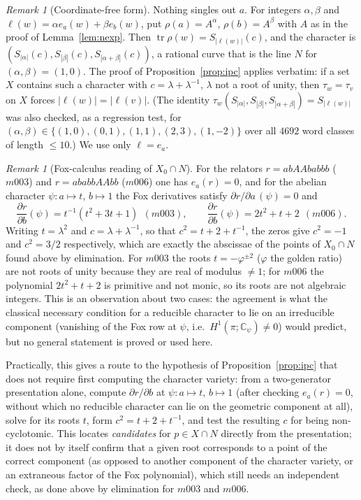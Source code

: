 \documentclass[11pt,a4paper]{article}
\theoremstyle{definition}
\theoremstyle{remark}
\newtheorem{remark}[theorem]{Remark}
\newcommand{\tr}{\operatorname{tr}}
\begin{document}
\begin{remark}[Coordinate-free form]
Nothing singles out $a$. For integers $\alpha,\beta$ and
$\ell(w)=\alpha e_a(w)+\beta e_b(w)$, put $\rho(a)=A^{\alpha}$,
$\rho(b)=A^{\beta}$ with $A$ as in the proof of
Lemma~\ref{lem:nexp}. Then $\tr\rho(w)=S_{|\ell(w)|}(c)$, and the
character is $(S_{|\alpha|}(c),S_{|\beta|}(c),S_{|\alpha+\beta|}(c))$,
a rational curve that is the line $N$ for $(\alpha,\beta)=(1,0)$.
The proof of Proposition~\ref{prop:ipc} applies verbatim: if a set $X$
contains such a character with $c=\lambda+\lambda^{-1}$, $\lambda$ not a
root of unity, then $\tau_w=\tau_v$ on $X$ forces $|\ell(w)|=|\ell(v)|$.
(The identity $\tau_w(S_{|\alpha|},S_{|\beta|},S_{|\alpha+\beta|})=S_{|\ell(w)|}$
was also checked, as a regression test, for $(\alpha,\beta)\in\{(1,0),(0,1),
(1,1),(2,3),(1,-2)\}$ over all $4692$ word classes of length $\le10$.)
We use only $\ell=e_a$.
\end{remark}

\begin{remark}[Fox-calculus reading of $X_0\cap N$]
For the relators $r=abAAbabbb$ ($m003$) and $r=ababbAAbb$ ($m006$) one
has $e_a(r)=0$, and for the abelian character $\psi:a\mapsto t$, $b\mapsto1$
the Fox derivatives satisfy $\partial r/\partial a\,(\psi)=0$ and
\begin{equation}
\frac{\partial r}{\partial b}(\psi)=t^{-1}(t^2+3t+1)\ \ (m003),\qquad
\frac{\partial r}{\partial b}(\psi)=2t^2+t+2\ \ (m006).
\end{equation}
Writing $t=\lambda^2$ and $c=\lambda+\lambda^{-1}$, so that
$c^2=t+2+t^{-1}$, the zeros give $c^2=-1$ and $c^2=3/2$ respectively, which
are exactly the abscissae of the points of $X_0\cap N$ found above by
elimination. For $m003$ the roots $t=-\varphi^{\pm2}$ ($\varphi$ the golden
ratio) are not roots of unity because they are real of modulus
$\ne1$; for $m006$ the polynomial $2t^2+t+2$ is primitive and not monic, so its
roots are not algebraic integers. This is an observation about two cases: the
agreement is what the classical necessary condition for a reducible
character to lie on an irreducible component (vanishing of the Fox row at
$\psi$, i.e.\ $H^1(\pi;\mathbb{C}_\psi)\ne0$) would predict, but no
general statement is proved or used here.

Practically, this gives a route to the hypothesis of
Proposition~\ref{prop:ipc} that does not require first computing the
character variety: from a two-generator presentation alone, compute
$\partial r/\partial b$ at $\psi:a\mapsto t,\,b\mapsto1$ (after checking
$e_a(r)=0$, without which no reducible character can lie on the geometric
component at all), solve for its roots $t$, form $c^2=t+2+t^{-1}$, and
test the resulting $c$ for being non-cyclotomic. This locates
\emph{candidates} for $p\in X\cap N$ directly from the presentation; it
does not by itself confirm that a given root corresponds to a point of
the correct component (as opposed to another component of the character
variety, or an extraneous factor of the Fox polynomial), which still
needs an independent check, as done above by elimination for $m003$ and
$m006$.
\end{remark}
\end{document}
